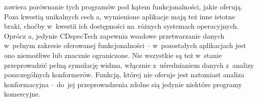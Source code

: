  zawiera porównanie tych programów pod kątem funkcjonalności, jakie oferują.
Poza kwestią unikalnych cech \tesliper{}a, wymienione aplikacje mają też inne istotne braki,
  choćby w~kwestii ich dostępności na~różnych systemach operacyjnych.
Oprócz \tesliper{}a, jedynie CDspecTech zapewnia wsadowe przetwarzanie danych w~pełnym zakresie
  oferowanej funkcjonalności \--- w~pozostałych aplikacjach jest ono niemożliwe
  lub znacznie ograniczone.
Nie wszystkie są też w~stanie przeprowadzić pełną symulację widma, włącznie z~uśrednianiem
  danych z~analizy poszczególnych konformerów.
Funkcją, której nie oferuje \tesliper{} jest natomiast analiza konformacyjna \--- do~jej
  przeprowadzenia zdolne sią jedynie niektóre programy komercyjne.
